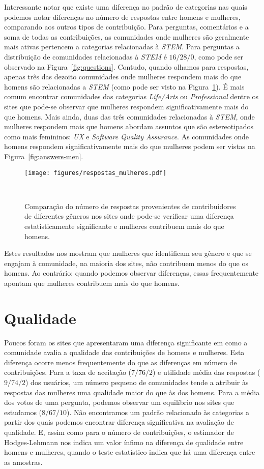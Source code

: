 Interessante notar que existe uma diferença no padrão de categorias nas quais podemos notar diferenças no número de respostas entre homens e mulheres, comparando aos outros tipos de contribuição. Para perguntas, comentários e a soma de todas as contribuições, as comunidades onde mulheres são geralmente mais ativas pertencem a categorias relacionadas à \emph{STEM}. Para perguntas a distribuição de comunidades relacionadas à \emph{STEM} é $16/28/0$, como pode ser observado na Figura~\ref{fig:questions}. Contudo, quando olhamos para respostas, apenas três das dezoito comunidades onde mulheres respondem mais do que homens são relacionadas a \emph{STEM} (como pode ser visto na Figura~\ref{fig:answers}). É mais comum encontrar comunidades das categorias \emph{Life/Arts} ou \emph{Professional} dentre os sites que pode-se observar que mulheres respondem significativamente mais do que homens. Mais ainda, duas das três comunidades relacionadas à \emph{STEM}, onde mulheres respondem mais que homens abordam assuntos que são estereotipados como mais femininos: \emph{UX} e \textit{Software Quality Assurance}. As comunidades onde homens respondem significativamente mais do que mulheres podem ser vistas na Figura~\ref{fig:answers-men}.

\begin{figure}
  \centering
  \texttt{[image: figures/respostas\_mulheres.pdf]}
  \caption[Comparação do número de respostas em comunidades onde mulheres respondem mais.]{Comparação do número de respostas provenientes de contribuidores de diferentes gêneros nos sites onde pode-se verificar uma diferença estatisticamente significante e mulheres contribuem mais do que homens.}~\label{fig:answers}
\end{figure}


Estes resultados nos mostram que mulheres que identificam seu gênero e que se engajam à comunidade, na maioria dos sites, não contribuem menos do que os homens. Ao contrário: quando podemos observar diferenças, essas frequentemente apontam que mulheres contribuem mais do que homens.

\section{Qualidade} %
\label{subsec:qualidade}
Poucos foram os sites que apresentaram uma diferença significante em como a comunidade avalia a qualidade das contribuições de homens e mulheres. Esta diferença ocorre menos frequentemente do que as diferenças em número de contribuições. Para a taxa de aceitação ($7/76/2$) e utilidade média das respostas ($9/74/2$) dos usuários, um número pequeno de comunidades tende a atribuir às respostas das mulheres uma qualidade maior do que às dos homens. Para a média dos votos de uma pergunta, podemos observar um equilíbrio nos sites que estudamos ($8/67/10$). Não encontramos um padrão relacionado às categorias a partir dos quais podemos encontrar diferença significativa na avaliação de qualidade. E, assim como para o número de contribuições, o estimador de Hodges-Lehmann nos indica um valor ínfimo na diferença de qualidade entre homens e mulheres, quando o teste estatístico indica que há uma diferença entre as amostras.

